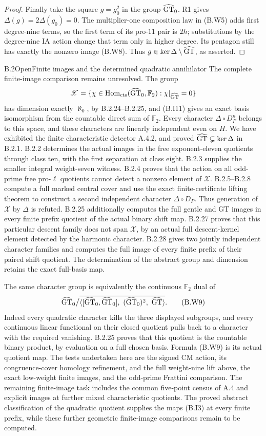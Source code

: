 \begin{proof}
Finally take the square $g=g_0^2$ in the group $\widehat{\mathrm{GT}}_0$.
R1 gives $\Delta(g)=2\Delta(g_0)=0$.
The multiplier-one composition law in (B.W5) adds
first degree-nine terms, so the first term of its
pro-$11$ pair is $2h$; substitutions by the degree-nine
IA action change that term only in higher degree.
Its pentagon still has exactly the nonzero image
(B.W8). Thus $g\in\ker\Delta\setminus\widehat{\mathrm{GT}}$, as asserted.
\end{proof}

\begin{result}{B.2}{Open}{Finite images and the determined quadratic annihilator}
The complete finite-image comparison remains unresolved.
The group
\[
 \mathscr X=
 \{\chi\in\operatorname{Hom}_{\rm cts}(\widehat{\mathrm{GT}}_0,\mathbb F_2):
                     \chi|_{\widehat{\mathrm{GT}}}=0\}
\]
has dimension exactly $\aleph_0$, by B.2.24--B.2.25,
and (B.I11) gives an exact basis isomorphism from the
countable direct sum of $\mathbb F_2$. Every character
$\Delta\circ D_P^n$ belongs to this space, and these
characters are linearly independent even on $H$.
We have exhibited the
finite characteristic detector A.4.2, and proved
$\widehat{\mathrm{GT}}\subsetneq\ker\Delta$ in B.2.1.
B.2.2 determines the actual images in the free
exponent-eleven quotients through class ten, with the
first separation at class eight. B.2.3 supplies the
smaller integral weight-seven witness. B.2.4 proves
that the action on all odd-prime free pro-$\ell$
quotients cannot detect a nonzero element of
$\mathscr X$.
B.2.5--B.2.8 compute a full marked central cover and
use the exact finite-certificate lifting theorem to
construct a second independent character
$\Delta\circ D_P$. Thus generation of $\mathscr X$
by $\Delta$ is refuted. B.2.25 additionally computes
the full gentle and GT images in every finite prefix
quotient of the actual binary shift map.  B.2.27 proves
that this particular descent family does not span
$\mathscr X$, by an actual full descent-kernel element
detected by the harmonic character.  B.2.28 gives two
jointly independent character families and computes
the full image of every finite prefix of their paired
shift quotient.  The determination of the abstract
group and dimension retains the exact full-basis map.
\end{result}

The same character group is equivalently the continuous
$\mathbb F_2$ dual of
\[
 \widehat{\mathrm{GT}}_0\big/
 \overline{\langle[\widehat{\mathrm{GT}}_0,\widehat{\mathrm{GT}}_0],\ (\widehat{\mathrm{GT}}_0)^2,\ \widehat{\mathrm{GT}}\rangle}.
 \tag{B.W9}
\]
Indeed every quadratic character kills the three displayed
subgroups, and every continuous linear functional on their
closed quotient pulls back to a character with the required
vanishing. B.2.25 proves that this quotient is the
countable binary product, by evaluation on a full
chosen basis. Formula (B.W9) is its actual quotient map.
The tests undertaken here are the signed
CM action, its congruence-cover homology refinement, and
the full weight-nine lift above, the exact low-weight
finite images, and the odd-prime Frattini comparison.
The remaining finite-image task includes the common
five-point census of A.4 and explicit images at further
mixed characteristic quotients. The proved abstract
classification of the quadratic quotient supplies the
maps (B.I3) at every finite prefix, while these further
geometric finite-image comparisons remain to be computed.
